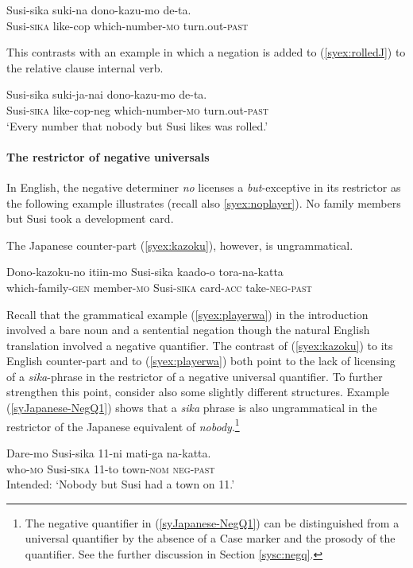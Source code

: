 \documentclass[output=paper,colorlinks,citecolor=brown,
]{langscibook}
\def\M#1{\textsc{#1}}
\begin{document}
\ea \label{syex:rolledJ}
\gll *Susi-sika suki-na dono-kazu-mo de-ta.\\
Susi-\M{sika} like-cop which-number-\M{mo} turn.out-\M{past}\\\z

This contrasts with an example in which a negation is added to (\ref{syex:rolledJ}) to the relative clause internal verb.

\ea \gll Susi-sika suki-ja-nai dono-kazu-mo de-ta.\\
Susi-\M{sika} like-cop-neg which-number-\M{mo} turn.out-\M{past}\\
\glt `Every number that nobody but Susi likes was rolled.'\z

\paragraph{The restrictor of negative universals}   In English, the negative determiner \emph{no} licenses a \emph{but}-exceptive in its restrictor as the following example illustrates (recall also \ref{syex:noplayer}).
\ea{} No family members but Susi took a development card. \z

The  Japanese counter-part (\ref{syex:kazoku}), however, is ungrammatical.

\ea \label{syex:kazoku}
\gll *Dono-kazoku-no itiin-mo Susi-sika kaado-o tora-na-katta\\
which-family-\M{gen} member-\M{mo} Susi-\M{sika} card-\M{acc} take-\M{neg-past}\\
\z

Recall that the grammatical example (\ref{syex:playerwa}) in the introduction involved a bare noun and a sentential negation though the natural English translation involved a negative quantifier. The contrast of (\ref{syex:kazoku}) to its English counter-part and to (\ref{syex:playerwa}) both point to the lack of licensing of a \emph{sika}-phrase in the restrictor of a negative universal quantifier.  To further strengthen this point, consider also some slightly different structures.
Example (\ref{syJapanese-NegQ1}) shows that a \emph{sika} phrase is also ungrammatical in the restrictor of the Japanese equivalent of \emph{nobody}.\footnote{The negative quantifier in (\ref{syJapanese-NegQ1}) can be distinguished from a universal quantifier by the absence of a Case marker and the prosody of the quantifier. See the further discussion in Section \ref{sysc:negq}.}

\ea \label{syJapanese-NegQ1}
\gll *Dare-mo Susi-sika 11-ni mati-ga na-katta.\\
who-\M{mo} Susi-\M{sika} 11-to town-\M{nom} \M{neg}-\M{past}\\
\glt Intended: `Nobody but Susi had a town on 11.'\z
\end{document}
